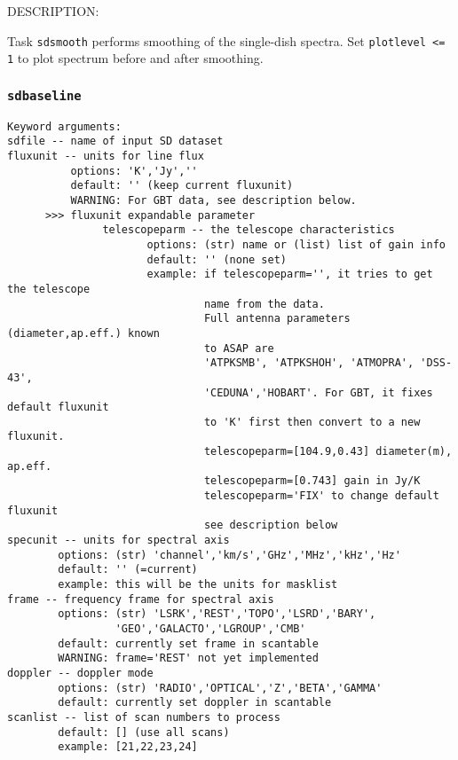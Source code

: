     DESCRIPTION:

    Task {\tt sdsmooth} performs smoothing of the single-dish spectra.
    Set {\tt plotlevel <= 1} to plot spectrum before and after smoothing.

    
\subsubsection{{\tt sdbaseline}}
\label{section:sd.sdtasks.tasks.sdbaseline}

\begin{verbatim}
Keyword arguments:
sdfile -- name of input SD dataset
fluxunit -- units for line flux
	      options: 'K','Jy',''
	      default: '' (keep current fluxunit)
	      WARNING: For GBT data, see description below.
	  >>> fluxunit expandable parameter
               telescopeparm -- the telescope characteristics
                      options: (str) name or (list) list of gain info
                      default: '' (none set)
                      example: if telescopeparm='', it tries to get the telescope
                               name from the data.
                               Full antenna parameters (diameter,ap.eff.) known
                               to ASAP are
                               'ATPKSMB', 'ATPKSHOH', 'ATMOPRA', 'DSS-43',
                               'CEDUNA','HOBART'. For GBT, it fixes default fluxunit
                               to 'K' first then convert to a new fluxunit.
                               telescopeparm=[104.9,0.43] diameter(m), ap.eff.
                               telescopeparm=[0.743] gain in Jy/K
                               telescopeparm='FIX' to change default fluxunit
                               see description below
specunit -- units for spectral axis
        options: (str) 'channel','km/s','GHz','MHz','kHz','Hz'
        default: '' (=current)
        example: this will be the units for masklist
frame -- frequency frame for spectral axis
        options: (str) 'LSRK','REST','TOPO','LSRD','BARY',
                 'GEO','GALACTO','LGROUP','CMB'
        default: currently set frame in scantable
        WARNING: frame='REST' not yet implemented
doppler -- doppler mode
        options: (str) 'RADIO','OPTICAL','Z','BETA','GAMMA'
        default: currently set doppler in scantable
scanlist -- list of scan numbers to process
        default: [] (use all scans)
        example: [21,22,23,24]
        

\end{verbatim}

